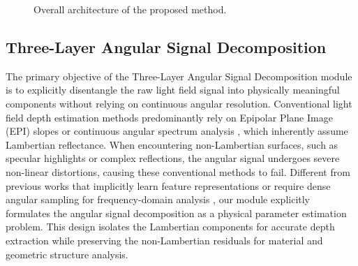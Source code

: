 \documentclass[lettersize,journal]{IEEEtran}
\begin{document}
\begin{figure}[!t]
{
}
\caption{Overall architecture of the proposed method.}
\label{fig:architecture}
\end{figure}

\subsection{Three-Layer Angular Signal Decomposition}

The primary objective of the Three-Layer Angular Signal Decomposition module is to explicitly disentangle the raw light field signal into physically meaningful components without relying on continuous angular resolution. Conventional light field depth estimation methods predominantly rely on Epipolar Plane Image (EPI) slopes \cite{vaswani2017} or continuous angular spectrum analysis \cite{vaswani2017}, which inherently assume Lambertian reflectance. When encountering non-Lambertian surfaces, such as specular highlights or complex reflections, the angular signal undergoes severe non-linear distortions, causing these conventional methods to fail. Different from previous works that implicitly learn feature representations \cite{vaswani2017} or require dense angular sampling for frequency-domain analysis \cite{vaswani2017}, our module explicitly formulates the angular signal decomposition as a physical parameter estimation problem. This design isolates the Lambertian components for accurate depth extraction while preserving the non-Lambertian residuals for material and geometric structure analysis.
\end{document}
